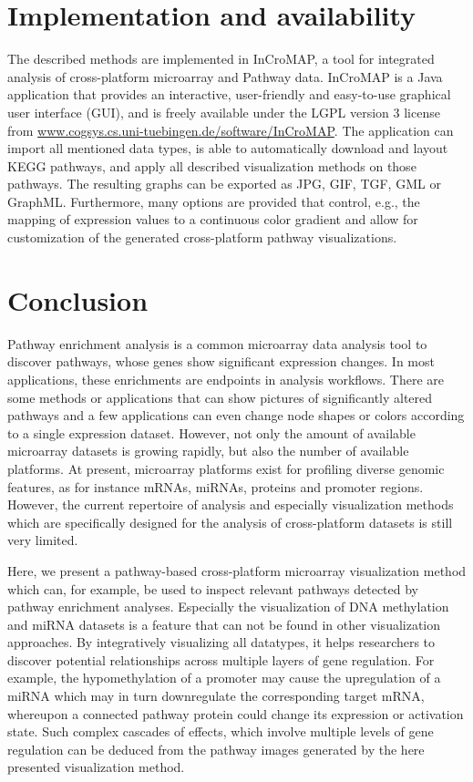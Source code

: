 \documentclass{bioinfo}
\begin{document}
\section{Implementation and availability}
The described methods are implemented in InCroMAP, a tool for integrated analysis of cross-platform microarray and Pathway data.
InCroMAP is a Java\texttrademark{} application that provides an interactive, user-friendly and easy-to-use graphical user interface (GUI), and is freely available under the LGPL version 3 license from \href{http://www.cogsys.cs.uni-tuebingen.de/software/InCroMAP/}{www.cogsys.cs.uni-tuebingen.de/software/InCroMAP}. The application can import all mentioned data types, is able to automatically download and layout KEGG pathways, and apply all described visualization methods on those pathways. The resulting graphs can be exported as JPG, GIF, TGF, GML or GraphML. Furthermore, many options are provided that control, e.g., the mapping of expression values to a continuous color gradient and allow for customization of the generated cross-platform pathway visualizations.


\section{Conclusion}

Pathway enrichment analysis is a common microarray data analysis tool to discover pathways, whose
genes show significant expression changes. In most applications, these enrichments are endpoints in
analysis workflows. There are some methods or applications that can show pictures of significantly
altered pathways and a few applications can even change node shapes or colors according to a single
expression dataset. However, not only the amount of available microarray datasets is growing
rapidly, but also the number of available platforms. At present, microarray platforms exist for
profiling diverse genomic features, as for instance mRNAs, miRNAs, proteins and promoter regions.
However, the current repertoire of analysis and especially visualization methods which are specifically designed for
the analysis of cross-platform datasets is still very limited.

Here, we present a pathway-based cross-platform microarray visualization method which
can, for example, be used to inspect relevant pathways detected by pathway enrichment analyses. Especially the
visualization of DNA methylation and miRNA datasets is a feature that can not be found in other
visualization approaches. By integratively visualizing all datatypes, it helps researchers to
discover potential relationships across multiple layers of gene regulation.
For example, the hypomethylation of a promoter may cause the upregulation of a miRNA which may in turn
downregulate the corresponding target mRNA, whereupon a connected pathway protein could change its expression or activation state.
Such complex cascades of effects, which involve multiple levels of gene regulation can be deduced from the pathway images
generated by the here presented visualization method.
\end{document}

